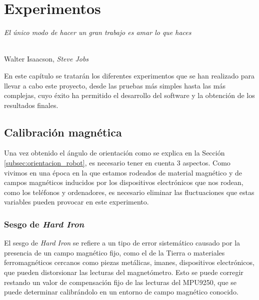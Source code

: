 \chapter{Experimentos}
\label{cap:capitulo6}

\begin{flushright}
\begin{minipage}[]{10cm}
\emph{El único modo de hacer un gran trabajo es amar lo que haces}\\
\end{minipage}\\

Walter Isaacson, \textit{Steve Jobs}\\
\end{flushright}

\vspace{1cm}


En este capítulo se tratarán los diferentes experimentos que se han realizado para llevar a cabo este proyecto, desde las pruebas más simples hasta las más complejas, cuyo éxito ha permitido el desarrollo del software y la obtención de los resultados finales.


\section{Calibración magnética}
\label{sec:cal_mag}

Una vez obtenido el ángulo de orientación como se explica en la Sección \ref{subsec:orientacion_robot}, es necesario tener en cuenta 3 aspectos. Como vivimos en una época en la que estamos rodeados de material magnético y de campos magnéticos inducidos por los dispositivos electrónicos que nos rodean, como los teléfonos y ordenadores, es necesario eliminar las fluctuaciones que estas variables pueden provocar en este experimento.\\

\subsection{Sesgo de \textit{Hard Iron}}
\label{subsec:hard_iron}

El sesgo de \textit{Hard Iron} se refiere a un tipo de error sistemático causado por la presencia de un campo magnético fijo, como el de la Tierra o materiales ferromagnéticos cercanos como piezas metálicas, imanes, dispositivos electrónicos, que pueden distorsionar las lecturas del magnetómetro. Esto se puede corregir restando un valor de compensación fijo de las lecturas del MPU9250, que se puede determinar calibrándolo en un entorno de campo magnético conocido.

